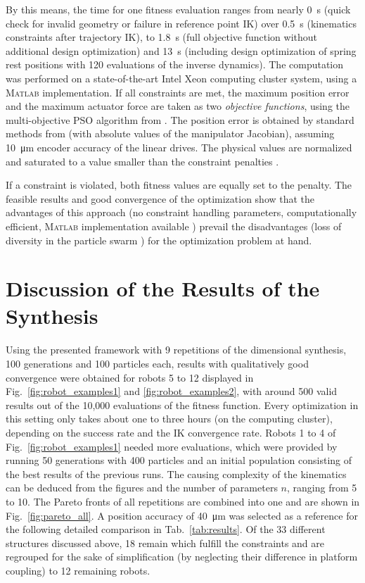 \documentclass{svproc}
\begin{document}
By this means, the time for one fitness evaluation ranges from nearly \SI{0}{\second} (quick check for invalid geometry or failure in reference point IK) over \SI{0.5}{\second} (kinematics constraints after trajectory IK), to \SI{1.8}{\second} (full objective function without additional design optimization) and \SI{13}{\second} (including design optimization of spring rest positions with 120 evaluations of the inverse dynamics).
The computation was performed on a state-of-the-art Intel Xeon computing cluster system, using a \textsc{Matlab} implementation. %
If all constraints are met, the maximum position error and the maximum actuator force are taken as two \emph{objective functions}, using the multi-objective PSO algorithm from \cite{CoelloPulLec2004}.
The position error is obtained by standard methods from \cite{Merlet2006} (with absolute values of the manipulator Jacobian), assuming \SI{10}{\micro\metre} encoder accuracy of the linear drives.
The physical values are normalized and saturated to a value smaller than the constraint penalties \cite{SchapplerOrt2020}.

If a constraint is violated, both fitness values are equally set to the penalty.
The feasible results and good convergence of the optimization show that the advantages of this approach (no constraint handling parameters, computationally efficient, \textsc{Matlab} implementation available \cite{CoelloPulLec2004}) prevail the disadvantages (loss of diversity in the particle swarm \cite{Mezura-MontesCoe2011}) for the optimization problem at hand.

\section{Discussion of the Results of the Synthesis}
\label{sec:results}

Using the presented framework with 9 repetitions of the dimensional synthesis, 100 generations and 100 particles each, results with qualitatively good convergence were obtained for robots 5 to 12 displayed in Fig.~\ref{fig:robot_examples1} and \ref{fig:robot_examples2}, with around 500 valid results out of the 10,000 evaluations of the fitness function.
Every optimization in this setting only takes about one to three hours (on the computing cluster), depending on the success rate and the IK convergence rate.
Robots 1 to 4 of Fig.~\ref{fig:robot_examples1} needed more evaluations, which were provided by running 50 generations with 400 particles and an initial population consisting of the best results of the previous runs.
The causing complexity of the kinematics can be deduced from the figures and the number of parameters $n$, ranging from 5 to 10.
The Pareto fronts of all repetitions are combined into one and are shown in  Fig.~\ref{fig:pareto_all}.
A position accuracy of \SI{40}{\micro\metre} was selected as a reference for the following detailed comparison in Tab.~\ref{tab:results}. 
Of the 33 different structures discussed above, 18 remain which fulfill the constraints and are regrouped for the sake of simplification (by neglecting their difference in platform coupling) to 12 remaining robots.
\end{document}
